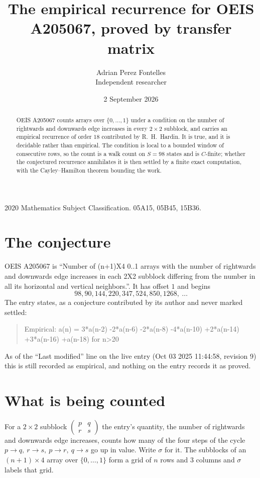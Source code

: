 \documentclass[11pt,a4paper]{article}
\title{The empirical recurrence for OEIS A205067, proved by transfer matrix}
\author{Adrian Perez Fontelles\\ \small Independent researcher}
\date{2 September 2026}
\theoremstyle{plain}
\theoremstyle{definition}
\begin{document}
\maketitle

\begin{abstract}
OEIS A205067 counts arrays over $\{0,\dots,1\}$ under a condition on the number of rightwards and downwards edge increases
in every $2\times2$ subblock, and carries an empirical recurrence of order $18$ contributed by
R.~H.~Hardin. It is true, and it is decidable rather than empirical. The condition is local to
a bounded window of consecutive rows, so the count is a walk count on $S=98$ states and is
$C$-finite; whether the conjectured recurrence annihilates it is then settled by a finite exact
computation, with the Cayley--Hamilton theorem bounding the work.
\end{abstract}

\noindent\small 2020 Mathematics Subject Classification. 05A15, 05B45, 15B36.\normalsize

\section{The conjecture}

OEIS A205067 is ``Number of (n+1)X4 0..1 arrays with the number of rightwards and downwards edge increases in each 2X2 subblock differing from the number in all its horizontal and vertical neighbors.''. It has offset $1$ and begins
\[
98, 90, 144, 220, 347, 524, 850, 1268,\ \dots
\]
The entry states, as a conjecture contributed by its author and never marked settled:
\begin{quote}
Empirical: a(n) = 3*a(n-2) -2*a(n-6) -2*a(n-8) -4*a(n-10) +2*a(n-14) +3*a(n-16) +a(n-18) for n>20
\end{quote}
As of the ``Last modified'' line on the live entry (Oct 03 2025 11:44:58, revision 9) this is still
recorded as empirical, and nothing on the entry records it as proved.

\section{What is being counted}

For a $2\times2$ subblock $\begin{pmatrix}p&q\\r&s\end{pmatrix}$ the
entry's quantity, the number of rightwards and downwards edge increases, counts how many of the four steps of the cycle $p\to q,\ r\to s,\ p\to r,\ q\to s$ go up in value. Write $\sigma$ for it. The subblocks of an
$(n+1)\times4$ array over $\{0,\dots,1\}$ form a grid of $n$ rows and $3$
columns and $\sigma$ labels that grid.
\end{document}
